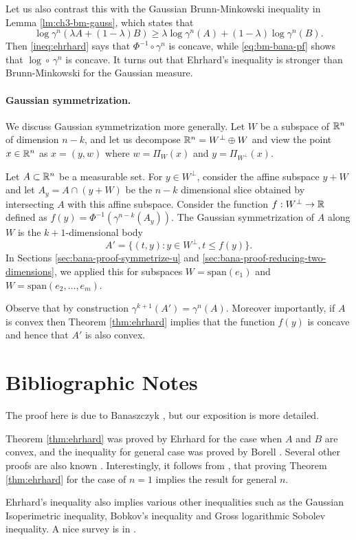 Let us also contrast this with the Gaussian Brunn-Minkowski inequality in Lemma \ref{lm:ch3-bm-gauss}, which states that 
\begin{equation}
    \label{eq:bm-bana-pf}\log \gamma^n(\lambda A+ (1-\lambda)B) \geq \lambda \log \gamma^n(A) + (1-\lambda) \log \gamma^n(B).
\end{equation}
Then \eqref{ineq:ehrhard} says that $\Phi^{-1} \circ \gamma^n$ is concave, while \eqref{eq:bm-bana-pf} shows that $\log \circ \,\gamma^n $ is concave.
It turns out that Ehrhard's inequality is stronger than Brunn-Minkowski for the Gaussian measure.


\paragraph{Gaussian symmetrization.}
We discuss Gaussian symmetrization more generally. Let $W$ be a subspace of $\mathbb{R}^n$ of dimension $n-k$, and let us decompose $\mathbb{R}^n = W^\perp \oplus W$ and view the point $x \in \mathbb{R}^n$ as $x = (y,w)$ where $ w= \Pi_W(x) $ and $y=\Pi_{W^\perp}(x)$.

Let $A \subset \mathbb{R}^n$ be a measurable set.
For $y \in {W}^\perp$,  consider the affine subspace $y + W$ and let $A_y = A \cap (y+W)$
be the $n-k$ dimensional slice obtained by intersecting $A$ with this affine subspace.
Consider the function $f:W^\perp \rightarrow \mathbb{R}$ defined as $f(y) = \Phi^{-1}(\gamma^{n-k}(A_y))$.
The Gaussian symmetrization of $A$ along $W$ is the $k+1$-dimensional body  
\[ A' =  \{(t,y): y \in W^{\perp}, t \leq f(y)\}.\] 
In Sections \ref{sec:bana-proof-symmetrize-u} and \ref{sec:bana-proof-reducing-two-dimensions}, we applied this for subspaces $W = \text{span}(e_1)$ and $W = \text{span}(e_2,\ldots,e_{m})$.

Observe that by construction $\gamma^{k+1}(A') = \gamma^n(A)$.
Moreover importantly, if $A$ is convex then Theorem \ref{thm:ehrhard} implies that the function $f(y)$ is concave and hence that $A'$ is also convex.

\section{Bibliographic Notes}
The proof here is due to Banaszczyk \cite{Bana98}, but our exposition is more detailed.

Theorem \ref{thm:ehrhard} was proved by
Ehrhard \cite{Ehrhard1983} for the case when $A$ and $B$ are convex, and the inequality for general case was proved by Borell \cite{BORELL2003}.
Several other proofs are also known \cite{handel2018, neeman20}.
Interestingly, it follows from \cite{Ehrhard1983},  that proving Theorem \ref{thm:ehrhard} for the case of $n=1$ implies the result for general $n$.

Ehrhard's inequality also implies various other inequalities such as  the Gaussian Isoperimetric inequality, Bobkov's inequality and Gross logarithmic Sobolev inequality. A nice survey is in \cite{Latala-icm02}.


